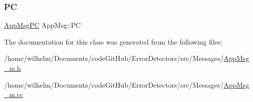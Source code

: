 \subsubsection{\texorpdfstring{PC}{PC}}
{\footnotesize\ttfamily \hyperlink{_app_msg__m_8h_abcd76636e4b750d033ffc348601dd7a2}{App\+Msg\+PC} App\+Msg\+::\+PC\hspace{0.3cm}{\ttfamily [protected]}}



The documentation for this class was generated from the following files\+:\begin{DoxyCompactItemize}
\item 
/home/wilhelm/\+Documents/code\+Git\+Hub/\+Error\+Detectors/src/\+Messages/\hyperlink{_app_msg__m_8h}{App\+Msg\+\_\+m.\+h}\item 
/home/wilhelm/\+Documents/code\+Git\+Hub/\+Error\+Detectors/src/\+Messages/\hyperlink{_app_msg__m_8cc}{App\+Msg\+\_\+m.\+cc}\end{DoxyCompactItemize}
